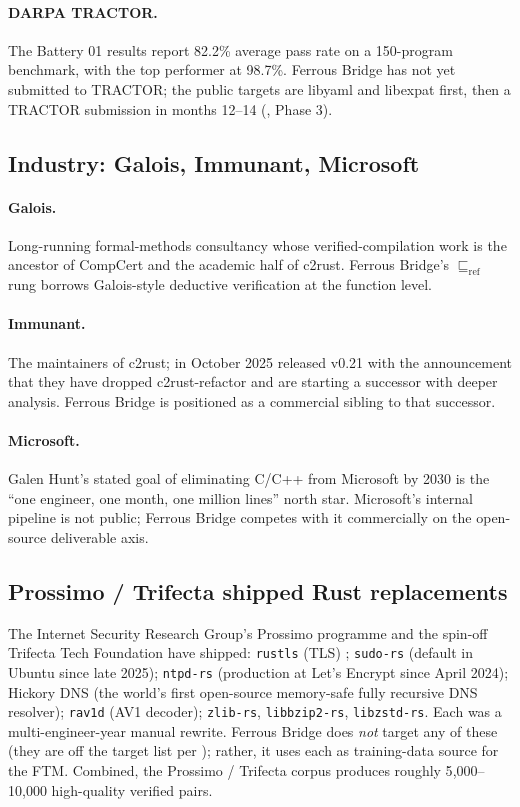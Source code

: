 \documentclass[12pt]{article}
\theoremstyle{definition}
\theoremstyle{remark}
\newcommand{\Refine}{\ensuremath{\sqsubseteq_{\!\mathrm{ref}}}}
\begin{document}
\paragraph{DARPA TRACTOR.} The Battery 01 results \cite{tractor2024}
report 82.2\% average pass rate on a 150-program benchmark, with the
top performer at 98.7\%. Ferrous Bridge has not yet submitted to
TRACTOR; the public targets are libyaml and libexpat first, then a
TRACTOR submission in months 12--14 (\cite{economics2026}, Phase 3).

\subsection{Industry: Galois, Immunant, Microsoft}

\paragraph{Galois.} Long-running formal-methods consultancy whose
verified-compilation work is the ancestor of CompCert and the academic
half of c2rust. Ferrous Bridge's $\Refine$ rung borrows Galois-style
deductive verification at the function level.

\paragraph{Immunant.} The maintainers of c2rust; in October 2025
released v0.21 with the announcement that they have dropped
c2rust-refactor and are starting a successor with deeper analysis.
Ferrous Bridge is positioned as a commercial sibling to that successor.

\paragraph{Microsoft.} Galen Hunt's stated goal of eliminating C/C++
from Microsoft by 2030 is the ``one engineer, one month, one million
lines'' north star. Microsoft's internal pipeline is not public;
Ferrous Bridge competes with it commercially on the open-source
deliverable axis.

\subsection{Prossimo / Trifecta shipped Rust replacements}

The Internet Security Research Group's Prossimo programme and the
spin-off Trifecta Tech Foundation have shipped:
\texttt{rustls} (TLS) \cite{rustls};
\texttt{sudo-rs} (default in Ubuntu since late 2025);
\texttt{ntpd-rs} (production at Let's Encrypt since April 2024);
Hickory DNS (the world's first open-source memory-safe fully recursive
DNS resolver);
\texttt{rav1d} (AV1 decoder);
\texttt{zlib-rs}, \texttt{libbzip2-rs}, \texttt{libzstd-rs}.
Each was a multi-engineer-year manual rewrite. Ferrous Bridge does
\emph{not} target any of these (they are off the target list per
\cite{ferroustargets2026}); rather, it uses each as training-data
source for the FTM. Combined, the Prossimo / Trifecta corpus produces
roughly 5{,}000--10{,}000 high-quality verified pairs.
\end{document}
